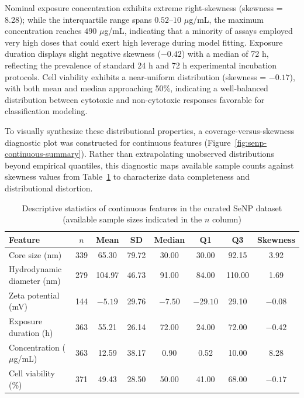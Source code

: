Nominal exposure concentration exhibits extreme right-skewness (skewness = 8.28); while the interquartile range spans $0.52$--$10$ $\mu$g/mL, the maximum concentration reaches $490$ $\mu$g/mL, indicating that a minority of assays employed very high doses that could exert high leverage during model fitting. Exposure duration displays slight negative skewness ($-0.42$) with a median of 72 h, reflecting the prevalence of standard 24 h and 72 h experimental incubation protocols. Cell viability exhibits a near-uniform distribution (skewness = $-0.17$), with both mean and median approaching 50\%, indicating a well-balanced distribution between cytotoxic and non-cytotoxic responses favorable for classification modeling.

To visually synthesize these distributional properties, a coverage-versus-skewness diagnostic plot was constructed for continuous features (Figure~\ref{fig:senp-continuous-summary}). Rather than extrapolating unobserved distributions beyond empirical quantiles, this diagnostic maps available sample counts against skewness values from Table~\ref{tab:senp_feature_statistics} to characterize data completeness and distributional distortion.

\begin{table}[H]
  \centering
  \caption{Descriptive statistics of continuous features in the curated SeNP dataset (available sample sizes indicated in the $n$ column)}
  \label{tab:senp_feature_statistics}
  \begin{tabular}{lccccccc}
    \hline
    Feature & $n$ & Mean & SD & Median & Q1 & Q3 & Skewness \\
    \hline
    Core size (nm)               & 339 & 65.30  & 79.72  & 30.00  & 30.00  & 92.15   & 3.92  \\
    Hydrodynamic diameter (nm)   & 279 & 104.97 & 46.73  & 91.00  & 84.00  & 110.00  & 1.69  \\
    Zeta potential (mV)          & 144 & $-5.19$ & 29.76  & $-7.50$ & $-29.10$ & 29.10 & $-0.08$ \\
    Exposure duration (h)        & 363 & 55.21  & 26.14  & 72.00  & 24.00  & 72.00   & $-0.42$ \\
    Concentration ($\mu$g/mL)    & 363 & 12.59  & 38.17  & 0.90   & 0.52   & 10.00   & 8.28  \\
    Cell viability (\%)          & 371 & 49.43  & 28.50  & 50.00  & 41.00  & 68.00   & $-0.17$ \\
    \hline
  \end{tabular}
\end{table}

